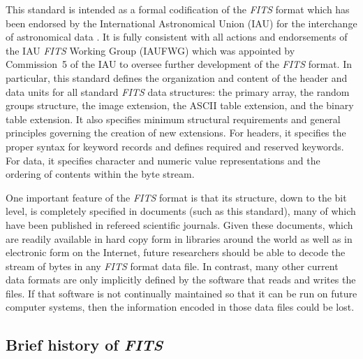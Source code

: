 \documentclass[onecolumn]{aa}
\begin{document}
   This standard is intended as a  formal codification of the {\em
   FITS\/} format  which has been  endorsed by the International
   Astronomical Union (IAU) for the interchange of astronomical
   data \citep{iau83}. It is fully  consistent with all actions and endorsements of
   the  IAU {\em FITS\/} Working Group (IAUFWG) which was
   appointed by Commission~5 of the IAU to oversee further development of
   the  {\em FITS\/} format.   In particular, this standard defines the
   organization and content  of the header and data units for all 
   standard {\em FITS\/} data structures: the primary array, the random
   groups structure,  the image  extension, the  ASCII table extension,
   and the binary table extension.   It also specifies minimum  structural
   requirements and general principles governing the creation of new
   extensions.   For headers, it specifies the  proper syntax for keyword
   records and defines   required and  reserved keywords.  For
   data, it specifies character and numeric value representations and the
   ordering  of contents within the byte stream.  

   One important feature of the {\em FITS\/} format is that its structure,
   down to the bit level, is completely specified in documents (such as
   this standard), many of which have been published in refereed scientific
   journals.  Given these documents, which are readily  available in hard
   copy form in libraries around the world as well as in electronic form
   on the Internet, future researchers should be able to decode the stream
   of bytes in any {\em FITS\/} format data file.  In contrast, many other current
   data formats are only implicitly defined by the software that reads and
   writes the files.  If that software is not continually maintained so
   that it can be run on future computer systems, then the information
   encoded in those data files could be lost.

\subsection{Brief history of {\em FITS}}
\end{document}
